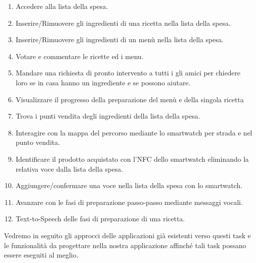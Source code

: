 \begin{enumerate}
\item Accedere alla lista della spesa.
\item Inserire/Rimuovere gli ingredienti di una ricetta nella lista della spesa.
\item Inserire/Rimuovere gli ingredienti di un menù nella lista della spesa.

\item Votare e commentare le ricette ed i menu.

\item Mandare una richiesta di pronto intervento a tutti i gli amici per chiedere loro se in casa hanno un ingrediente e se possono aiutare.

\item Visualizzare il progresso della preparazione del menù e della singola ricetta



\item Trova i punti vendita degli ingredienti della lista della spesa.
\item Interagire con la mappa del percorso mediante lo smartwatch per strada e nel punto vendita.
\item Identificare il prodotto acquistato con l'NFC dello smartwatch eliminando la relativa voce dalla lista della spesa.
\item Aggiungere/confermare una voce nella lista della spesa con lo smartwatch.


\item Avanzare con le fasi di preparazione passo-passo mediante messaggi vocali.
\item Text-to-Speech delle fasi di preparazione di una ricetta.


\end{enumerate}

Vedremo in seguito gli approcci delle applicazioni già esistenti verso
questi task e le funzionalità da progettare nella nostra applicazione
affinché tali task possano essere eseguiti al meglio.


